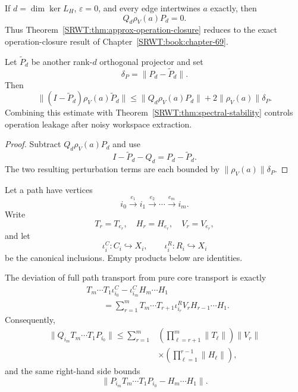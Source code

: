 \begin{SRWTcorollary}
If \(d=\dim\ker L_H\), \(\varepsilon=0\), and every edge intertwines \(a\)
exactly, then
\[
Q_d\rho_V(a)P_d=0.
\]
Thus Theorem~\ref{SRWT:thm:approx-operation-closure} reduces to the exact
operation-closure result of Chapter~\ref{SRWT:book:chapter-69}.
\end{SRWTcorollary}

\begin{SRWTcorollary}\label{SRWT:cor:closure-drift}
Let \(\widetilde P_d\) be another rank-\(d\) orthogonal projector and set
\[
\delta_P=\|P_d-\widetilde P_d\|.
\]
Then
\[
\boxed{
\|(I-\widetilde P_d)\rho_V(a)\widetilde P_d\|
\leq
\|Q_d\rho_V(a)P_d\|
+2\|\rho_V(a)\|\delta_P.
}
\]
Combining this estimate with Theorem~\ref{SRWT:thm:spectral-stability} controls
operation leakage after noisy workspace extraction.
\end{SRWTcorollary}

\begin{proof}
Subtract \(Q_d\rho_V(a)P_d\) and use
\[
I-\widetilde P_d-Q_d=P_d-\widetilde P_d.
\]
The two resulting perturbation terms are each bounded by
\(\|\rho_V(a)\|\delta_P\).
\end{proof}


Let a path have vertices
\[
i_0\xrightarrow{e_1}i_1\xrightarrow{e_2}\cdots
\xrightarrow{e_m}i_m.
\]
Write
\[
T_r=T_{e_r},
\quad
H_r=H_{e_r},
\quad
V_r=V_{e_r},
\]
and let
\[
\iota_i^C:C_i\hookrightarrow X_i,
\qquad
\iota_i^R:R_i\hookrightarrow X_i
\]
be the canonical inclusions. Empty products below are identities.

\begin{SRWTtheorem}\label{SRWT:thm:residual-duhamel}
The deviation of full path transport from pure core transport is exactly
\[
\boxed{
\begin{aligned}
&T_m\cdots T_1\iota_{i_0}^C
-
\iota_{i_m}^C H_m\cdots H_1\\
&\qquad=
\sum_{r=1}^{m}
T_m\cdots T_{r+1}
\iota_{i_r}^R V_r
H_{r-1}\cdots H_1.
\end{aligned}
}
\]
Consequently,
\[
\boxed{
\begin{aligned}
\|Q_{i_m}T_m\cdots T_1P_{i_0}\|
\leq
\sum_{r=1}^{m}
&\left(\prod_{\ell=r+1}^{m}\|T_\ell\|\right)
\|V_r\|\\
&\times
\left(\prod_{\ell=1}^{r-1}\|H_\ell\|\right),
\end{aligned}
}
\]
and the same right-hand side bounds
\[
\|P_{i_m}T_m\cdots T_1P_{i_0}-H_m\cdots H_1\|.
\]
\end{SRWTtheorem}

